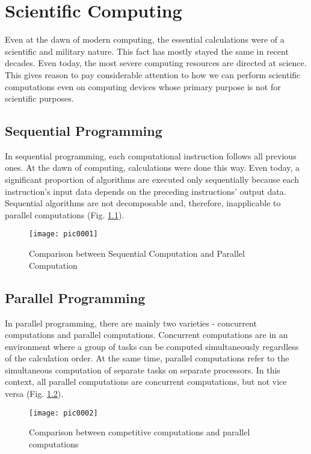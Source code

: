 \newpage
\chapter{Scientific Computing}
\label{chapter01}

Even at the dawn of modern computing, the essential calculations were of a scientific and military nature. This fact has mostly stayed the same in recent decades. Even today, the most severe computing resources are directed at science. This gives reason to pay considerable attention to how we can perform scientific computations even on computing devices whose primary purpose is not for scientific purposes.

\section{Sequential Programming}

In sequential programming, each computational instruction follows all previous ones. At the dawn of computing, calculations were done this way. Even today, a significant proportion of algorithms are executed only sequentially because each instruction's input data depends on the preceding instructions' output data. Sequential algorithms are not decomposable and, therefore, inapplicable to parallel computations (Fig. \ref{fig:pic0001}).

\begin{figure}[h]
\centering
\texttt{[image: pic0001]}
\caption{Comparison between Sequential Computation and Parallel Computation}
\label{fig:pic0001}
\end{figure}

\section{Parallel Programming}

In parallel programming, there are mainly two varieties - concurrent computations and parallel computations. Concurrent computations are in an environment where a group of tasks can be computed simultaneously regardless of the calculation order. At the same time, parallel computations refer to the simultaneous computation of separate tasks on separate processors. In this context, all parallel computations are concurrent computations, but not vice versa (Fig. \ref{fig:pic0002}).

\begin{figure}[h]
\centering
\texttt{[image: pic0002]}
\caption{Comparison between competitive computations and parallel computations}
\label{fig:pic0002}
\end{figure}

